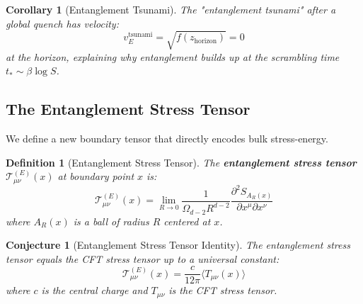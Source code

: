 \documentclass[12pt,a4paper]{article}
\newtheorem{conjecture}[theorem]{Conjecture}
\newtheorem{definition}[theorem]{Definition}
\newtheorem{corollary}[theorem]{Corollary}
\begin{document}
\begin{corollary}[Entanglement Tsunami]
The "entanglement tsunami" after a global quench has velocity:
\begin{equation}
v_E^{\text{tsunami}} = \sqrt{f(z_{\text{horizon}})} = 0
\end{equation}
at the horizon, explaining why entanglement builds up at the scrambling time $t_* \sim \beta \log S$.
\end{corollary}

\subsection{The Entanglement Stress Tensor}

We define a new boundary tensor that directly encodes bulk stress-energy.

\begin{definition}[Entanglement Stress Tensor]
The \textbf{entanglement stress tensor} $\mathcal{T}^{(E)}_{\mu\nu}(x)$ at boundary point $x$ is:
\begin{equation}
\mathcal{T}^{(E)}_{\mu\nu}(x) = \lim_{R \to 0} \frac{1}{\Omega_{d-2} R^{d-2}} \frac{\partial^2 S_{A_R(x)}}{\partial x^\mu \partial x^\nu}
\end{equation}
where $A_R(x)$ is a ball of radius $R$ centered at $x$.
\end{definition}

\begin{conjecture}[Entanglement Stress Tensor Identity]
The entanglement stress tensor equals the CFT stress tensor up to a universal constant:
\begin{equation}
\mathcal{T}^{(E)}_{\mu\nu}(x) = \frac{c}{12\pi} \langle T_{\mu\nu}(x) \rangle
\end{equation}
where $c$ is the central charge and $T_{\mu\nu}$ is the CFT stress tensor.
\end{conjecture}
\end{document}
